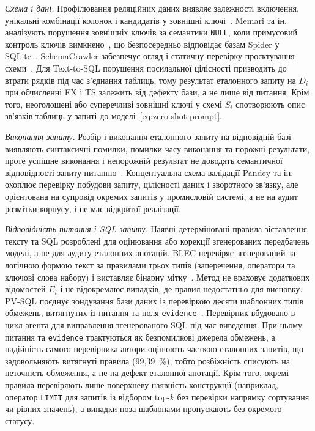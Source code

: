 \documentclass[a4paper,14pt,oneside]{extreport}
\begin{document}
\textit{Схема і дані.}
Профілювання реляційних даних виявляє залежності включення, унікальні комбінації колонок і кандидатів у зовнішні ключі~\cite{abedjan2015profiling}. Memari та ін. аналізують порушення зовнішніх ключів за семантики \texttt{NULL}, коли примусовий контроль ключів вимкнено~\cite{memari2015sql}, що безпосередньо відповідає базам Spider у SQLite~\cite{sqliteForeignKeys}. SchemaCrawler забезпечує огляд і статичну перевірку проєктування схеми~\cite{schemacrawler}. Для Text-to-SQL порушення посилальної цілісності призводить до втрати рядків під час з’єднання таблиць, тому результат еталонного запиту на \(D_i\) при обчисленні EX і TS залежить від дефекту бази, а не лише від питання. Крім того, неоголошені або суперечливі зовнішні ключі у схемі \(S_i\) спотворюють опис зв’язків таблиць у запиті до моделі~\eqref{eq:zero-shot-prompt}.

\textit{Виконання запиту.}
Розбір і виконання еталонного запиту на відповідній базі виявляють синтаксичні помилки, помилки часу виконання та порожні результати, проте успішне виконання і непорожній результат не доводять семантичної відповідності запиту питанню~\cite{liu2025nl2sqlbugs}. Концептуальна схема валідації Pandey та ін.~\cite{pandey2024validation} охоплює перевірку побудови запиту, цілісності даних і зворотного зв’язку, але орієнтована на супровід окремих запитів у промисловій системі, а не на аудит розмітки корпусу, і не має відкритої реалізації.

\textit{Відповідність питання і SQL-запиту.}
Наявні детерміновані правила зіставлення тексту та SQL розроблені для оцінювання або корекції згенерованих передбачень моделі, а не для аудиту еталонних анотацій. BLEC перевіряє згенерований за логічною формою текст за правилами трьох типів (заперечення, оператори та ключові слова набору) і виставляє бінарну мітку~\cite{shu2021blec}. Метод не враховує додаткових відомостей \(E_i\) і не відокремлює випадків, де правил недостатньо для висновку. PV-SQL поєднує зондування бази даних із перевіркою десяти шаблонних типів обмежень, витягнутих із питання та поля \texttt{evidence}~\cite{tian2026pvsql}. Перевірник вбудовано в цикл агента для виправлення згенерованого SQL під час виведення. При цьому питання та \texttt{evidence} трактуються як безпомилкові джерела обмежень, а надійність самого перевірника автори оцінюють часткою еталонних запитів, що задовольняють витягнуті правила (99,39~\%), тобто розбіжність списують на неточність обмеження, а не на дефект еталонної анотації. Крім того, окремі правила перевіряють лише поверхневу наявність конструкції (наприклад, оператор \texttt{LIMIT} для запитів із відбором top-$k$ без перевірки напрямку сортування чи рівних значень), а випадки поза шаблонами пропускають без окремого статусу.
\end{document}
